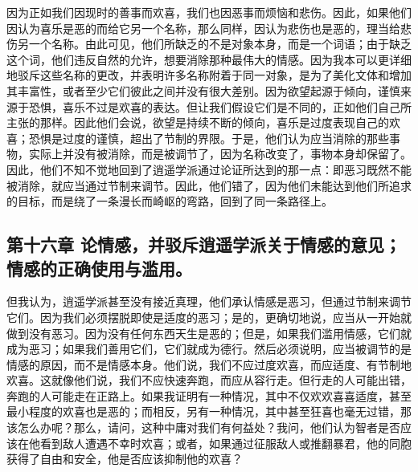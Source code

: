 因为正如我们因现时的善事而欢喜，我们也因恶事而烦恼和悲伤。因此，如果他们因认为喜乐是恶的而给它另一个名称，那么同样，因认为悲伤也是恶的，理当给悲伤另一个名称。由此可见，他们所缺乏的不是对象本身，而是一个词语；由于缺乏这个词，他们违反自然的允许，想要消除那种最伟大的情感。因为我本可以更详细地驳斥这些名称的更改，并表明许多名称附着于同一对象，是为了美化文体和增加其丰富性，或者至少它们彼此之间并没有很大差别。因为欲望起源于倾向，谨慎来源于恐惧，喜乐不过是欢喜的表达。但让我们假设它们是不同的，正如他们自己所主张的那样。因此他们会说，欲望是持续不断的倾向，喜乐是过度表现自己的欢喜；恐惧是过度的谨慎，超出了节制的界限。于是，他们认为应当消除的那些事物，实际上并没有被消除，而是被调节了，因为名称改变了，事物本身却保留了。因此，他们不知不觉地回到了逍遥学派通过论证所达到的那一点：即恶习既然不能被消除，就应当通过节制来调节。因此，他们错了，因为他们未能达到他们所追求的目标，而是绕了一条漫长而崎岖的弯路，回到了同一条路径上。\par


\subsection{第十六章 论情感，并驳斥逍遥学派关于情感的意见；情感的正确使用与滥用。}

但我认为，逍遥学派甚至没有接近真理，他们承认情感是恶习，但通过节制来调节它们。因为我们必须摆脱即使是适度的恶习；是的，更确切地说，应当从一开始就做到没有恶习。因为没有任何东西天生是恶的；但是，如果我们滥用情感，它们就成为恶习；如果我们善用它们，它们就成为德行。然后必须说明，应当被调节的是情感的原因，而不是情感本身。他们说，我们不应过度欢喜，而应适度、有节制地欢喜。这就像他们说，我们不应快速奔跑，而应从容行走。但行走的人可能出错，奔跑的人可能走在正路上。如果我证明有一种情况，其中不仅欢欢喜喜适度，甚至最小程度的欢喜也是恶的；而相反，另有一种情况，其中甚至狂喜也毫无过错，那该怎么办呢？那么，请问，这种中庸对我们有何益处？我问，他们认为智者是否应该在他看到敌人遭遇不幸时欢喜；或者，如果通过征服敌人或推翻暴君，他的同胞获得了自由和安全，他是否应该抑制他的欢喜？\par

